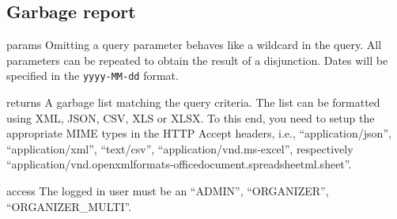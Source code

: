 \subsection{Garbage report}

\begin{apidata}{params}
  Omitting a query parameter behaves like a wildcard in the query. All
  parameters can be repeated to obtain the result of a disjunction. Dates will
  be specified in the \texttt{yyyy-MM-dd} format.
\end{apidata}
\begin{apidata}{returns}
  A garbage list matching the query criteria. The list can be formatted using
  XML, JSON, CSV, XLS or XLSX. To this end, you need to setup the appropriate
  MIME types in the HTTP Accept headers, i.e., ``application/json'',
  ``application/xml'', ``text/csv'', ``application/vnd.ms-excel'', respectively
  ``application/vnd.openxmlformats-officedocument.spreadsheetml.sheet''.
\end{apidata}
\begin{apidata}{access}
The logged in user must be an ``ADMIN'', ``ORGANIZER'', ``ORGANIZER\_MULTI''. 
\end{apidata}


